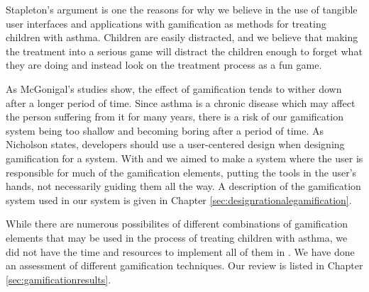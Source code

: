 Stapleton's argument is one the reasons for why we believe in the use of tangible user interfaces and applications with gamification as methods for treating children with asthma. Children are easily distracted, and we believe that making the treatment into a serious game will distract the children enough to forget what they are doing and instead look on the treatment process as a fun game.

As McGonigal's studies show, the effect of gamification tends to wither down after a longer period of time\cite{jane2011reality}. Since asthma is a chronic disease which may affect the person suffering from it for many years, there is a risk of our gamification system being too shallow and becoming boring after a period of time. As Nicholson\cite{nicholson2012user} states, developers should use a user-centered design when designing gamification for a system. With \app{} and \ab{} we aimed to make a system where the user is responsible for much of the gamification elements, putting the tools in the user's hands, not necessarily guiding them all the way. A description of the gamification system used in our system is given in Chapter \ref{sec:designrationalegamification}. 

While there are numerous possibilites of different combinations of gamification elements that may be used in the process of treating children with asthma, we did not have the time and resources to implement all of them in \app{}. We have done an assessment of different gamification techniques. Our review is listed in Chapter \ref{sec:gamificationresults}. 